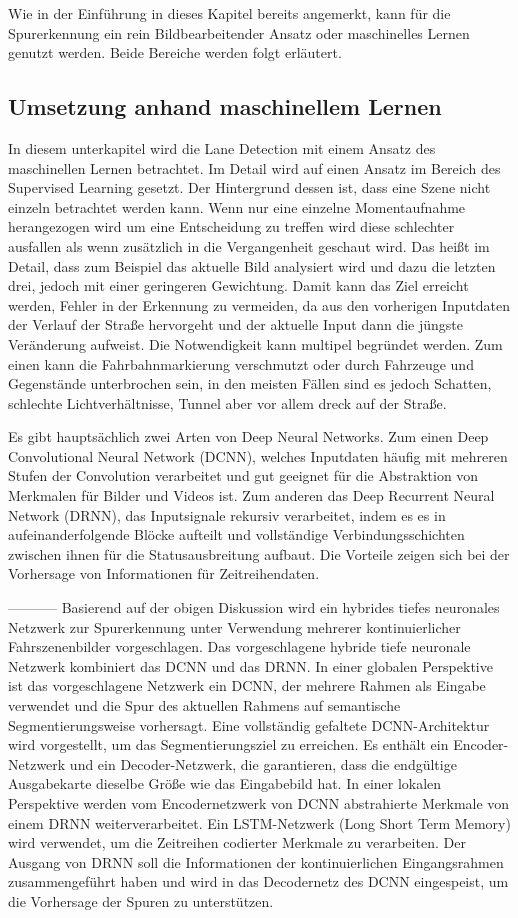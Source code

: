Wie in der Einführung in dieses Kapitel bereits angemerkt, kann für die Spurerkennung ein rein Bildbearbeitender Ansatz oder maschinelles Lernen genutzt werden. Beide Bereiche werden folgt erläutert.

\subsection{Umsetzung anhand maschinellem Lernen}
In diesem unterkapitel wird die Lane Detection mit einem Ansatz des maschinellen Lernen betrachtet. Im Detail wird auf einen Ansatz im Bereich des Supervised Learning gesetzt.
Der Hintergrund dessen ist, dass eine Szene nicht einzeln betrachtet werden kann. Wenn nur eine einzelne Momentaufnahme herangezogen wird um eine Entscheidung zu treffen wird diese schlechter ausfallen als wenn zusätzlich in die Vergangenheit geschaut wird. \cite{cnnld.2020}
Das heißt im Detail, dass zum Beispiel das aktuelle Bild analysiert wird und dazu die letzten drei, jedoch mit einer geringeren Gewichtung. Damit kann das Ziel erreicht werden, Fehler in der Erkennung zu vermeiden, da aus den vorherigen Inputdaten der Verlauf der Straße hervorgeht und der aktuelle Input dann die jüngste Veränderung aufweist. Die Notwendigkeit kann multipel begründet werden. Zum einen kann die Fahrbahnmarkierung verschmutzt oder durch Fahrzeuge und Gegenstände unterbrochen sein, in den meisten Fällen sind es jedoch Schatten, schlechte Lichtverhältnisse, Tunnel aber vor allem dreck auf der Straße.

Es gibt hauptsächlich zwei Arten von Deep Neural Networks. Zum einen Deep Convolutional Neural Network (DCNN), welches Inputdaten häufig mit mehreren Stufen der Convolution verarbeitet und gut geeignet für die Abstraktion von Merkmalen für Bilder und Videos ist. Zum anderen das Deep Recurrent Neural Network (DRNN), das Inputsignale rekursiv verarbeitet, indem es es in aufeinanderfolgende Blöcke aufteilt und vollständige Verbindungsschichten zwischen ihnen für die Statusausbreitung aufbaut. Die Vorteile zeigen sich bei der Vorhersage von Informationen für Zeitreihendaten.\cite{cnnld.2020}

-----------
Basierend auf der obigen Diskussion wird ein hybrides tiefes neuronales Netzwerk zur Spurerkennung unter Verwendung mehrerer kontinuierlicher Fahrszenenbilder vorgeschlagen. Das vorgeschlagene hybride tiefe neuronale Netzwerk kombiniert das DCNN und das DRNN. In einer globalen Perspektive ist das vorgeschlagene Netzwerk ein DCNN, der mehrere Rahmen als Eingabe verwendet und die Spur des aktuellen Rahmens auf semantische Segmentierungsweise vorhersagt. Eine vollständig gefaltete DCNN-Architektur wird vorgestellt, um das Segmentierungsziel zu erreichen. Es enthält ein Encoder-Netzwerk und ein Decoder-Netzwerk, die garantieren, dass die endgültige Ausgabekarte dieselbe Größe wie das Eingabebild hat. In einer lokalen Perspektive werden vom Encodernetzwerk von DCNN abstrahierte Merkmale von einem DRNN weiterverarbeitet. Ein LSTM-Netzwerk (Long Short Term Memory) wird verwendet, um die Zeitreihen codierter Merkmale zu verarbeiten. Der Ausgang von DRNN soll die Informationen der kontinuierlichen Eingangsrahmen zusammengeführt haben und wird in das Decodernetz des DCNN eingespeist, um die Vorhersage der Spuren zu unterstützen.

